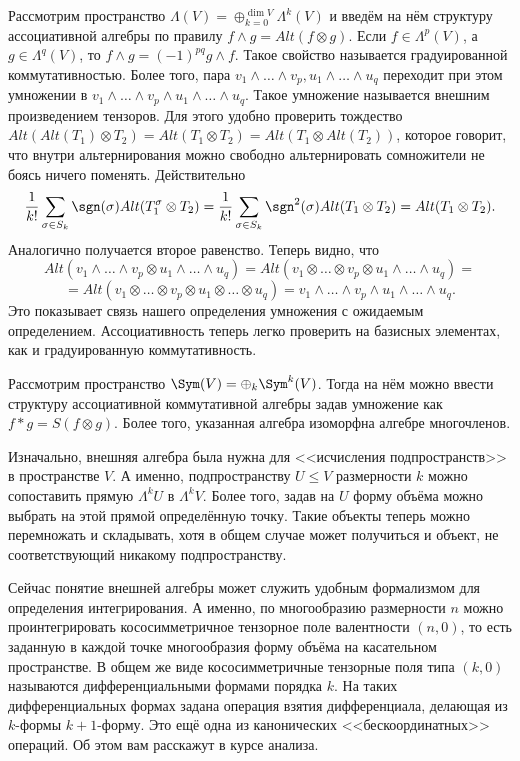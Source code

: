  Рассмотрим пространство $\Lambda(V)=\oplus_{k=0}^{\dim V} \Lambda^k(V)$ и введём на нём структуру ассоциативной алгебры по правилу $ f\wedge g= Alt(f\otimes g)$. Если $f\in \Lambda^p(V)$, а $g \in \Lambda^q(V)$, то $f\wedge g=(-1)^{pq}g \wedge f$. Такое свойство называется градуированной коммутативностью. Более того, пара $v_1 \wedge \dots \wedge v_p , u_1\wedge \dots \wedge u_q$ переходит при этом умножении в $v_1 \wedge \dots \wedge v_p \wedge u_1\wedge \dots \wedge u_q$. Такое умножение называется внешним произведением тензоров.
\proof Для этого удобно проверить тождество $Alt(Alt(T_1)\otimes T_2)= Alt(T_1\otimes T_2)= Alt(T_1 \otimes Alt(T_2))$, которое говорит, что внутри альтернирования можно свободно альтернировать сомножители не боясь ничего поменять. Действительно
$$\frac{1}{k!}\sum_{\sigma \in S_{k}}\sgn(\sigma) Alt(T_1^{\sigma}\otimes T_2)=\frac{1}{k!}\sum_{\sigma \in S_{k}} \sgn^2(\sigma) Alt(T_1\otimes T_2)=Alt(T_1 \otimes T_2).$$
Аналогично получается второе равенство. Теперь видно, что 
$$Alt(v_1 \wedge \dots \wedge v_p \otimes u_1\wedge \dots \wedge u_q)=Alt(v_1 \otimes \dots \otimes v_p \otimes u_1\wedge \dots \wedge u_q)=$$
$$=Alt( v_1 \otimes \dots \otimes v_p \otimes u_1\otimes \dots \otimes u_q) =v_1 \wedge \dots \wedge v_p  \wedge u_1\wedge \dots \wedge u_q .$$
Это показывает связь нашего определения умножения с ожидаемым определением. Ассоциативность теперь легко проверить на базисных элементах, как и градуированную коммутативность.
\endproof
\ethrm





 Рассмотрим пространство $\Sym(V)=\oplus_k \Sym^k(V)$. Тогда на нём можно ввести структуру ассоциативной коммутативной алгебры задав умножение как $ f*g= S(f\otimes g)$. Более того, указанная алгебра изоморфна алгебре многочленов.
\ethrm



Изначально, внешняя алгебра была нужна для <<исчисления подпространств>> в пространстве $V$. А именно, подпространству $U\leq V$ размерности $k$ можно сопоставить прямую $\Lambda^k U$ в $\Lambda^k V$. Более того, задав на $U$ форму объёма можно выбрать на этой прямой определённую точку. Такие объекты теперь можно перемножать и складывать, хотя в общем случае может получиться и объект, не соответствующий никакому подпространству. 

Сейчас понятие внешней алгебры может служить удобным формализмом для определения интегрирования. А именно, по многообразию размерности $n$ можно проинтегрировать кососимметричное тензорное поле валентности $(n,0)$, то есть заданную в каждой точке многообразия форму объёма на касательном пространстве. В общем же виде кососимметричные тензорные поля типа $(k,0)$ называются дифференциальными формами порядка $k$. На таких дифференциальных формах задана операция взятия дифференциала, делающая из $k$-формы $k+1$-форму. Это ещё одна из канонических <<бескоординатных>> операций. Об этом вам расскажут в курсе анализа.

